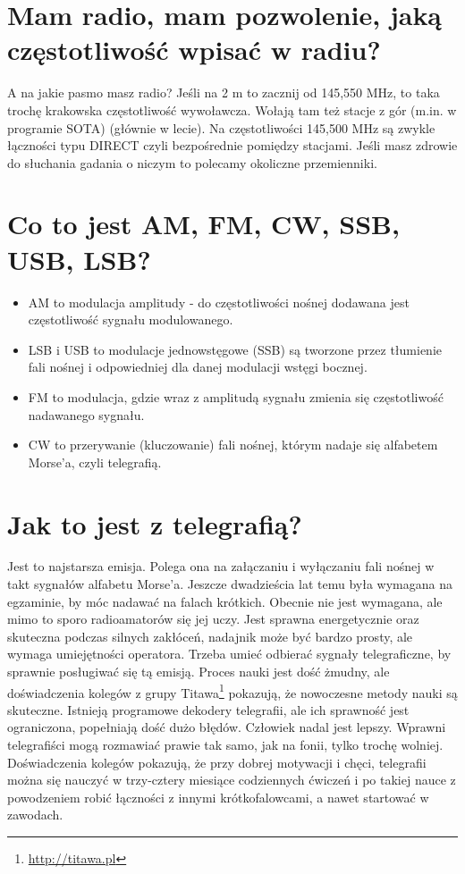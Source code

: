 \documentclass[a4paper,12pt]{article}
\begin{document}
\section{Mam radio, mam pozwolenie, jaką częstotliwość wpisać w radiu?}
A na jakie pasmo masz radio?
Jeśli na 2 m to zacznij od 145,550 MHz, to taka trochę krakowska częstotliwość wywoławcza. Wołają tam też stacje z gór (m.in. w programie SOTA) (głównie w lecie). Na częstotliwości 145,500 MHz są zwykle łączności typu DIRECT czyli bezpośrednie pomiędzy stacjami. Jeśli masz zdrowie do słuchania gadania o niczym to polecamy okoliczne przemienniki.

\section{Co to jest AM, FM, CW, SSB, USB, LSB?}
\begin{itemize}
\item AM to modulacja amplitudy - do częstotliwości nośnej dodawana jest częstotliwość sygnału modulowanego. 
\item LSB i USB to modulacje jednowstęgowe (SSB) są tworzone przez tłumienie fali nośnej i odpowiedniej dla danej modulacji wstęgi bocznej. 
\item FM to modulacja, gdzie wraz z amplitudą sygnału zmienia się częstotliwość nadawanego sygnału. 
\item CW to przerywanie (kluczowanie) fali nośnej, którym nadaje się alfabetem Morse'a, czyli telegrafią. \end{itemize}

\section{Jak to jest z telegrafią?}
Jest to najstarsza emisja. Polega ona na załączaniu i wyłączaniu fali nośnej w takt sygnałów alfabetu Morse'a. Jeszcze dwadzieścia lat temu była wymagana na egzaminie, by móc nadawać na falach krótkich. Obecnie nie jest wymagana, ale mimo to sporo radioamatorów się jej uczy. Jest sprawna energetycznie oraz skuteczna podczas silnych zakłóceń, nadajnik może być bardzo prosty, ale wymaga umiejętności operatora. Trzeba umieć odbierać sygnały telegraficzne, by sprawnie posługiwać się tą emisją. Proces nauki jest dość żmudny, ale doświadczenia kolegów z grupy Titawa\footnote{\url{http://titawa.pl}} pokazują, że nowoczesne metody nauki są skuteczne. Istnieją programowe dekodery telegrafii, ale ich sprawność jest ograniczona, popełniają dość dużo błędów. Człowiek nadal jest lepszy. Wprawni telegrafiści mogą rozmawiać prawie tak samo, jak na fonii, tylko trochę wolniej. Doświadczenia kolegów pokazują, że przy dobrej motywacji i chęci, telegrafii można się nauczyć w trzy-cztery miesiące codziennych ćwiczeń i po takiej nauce z powodzeniem robić łączności z innymi krótkofalowcami, a nawet startować w zawodach.
\end{document}
